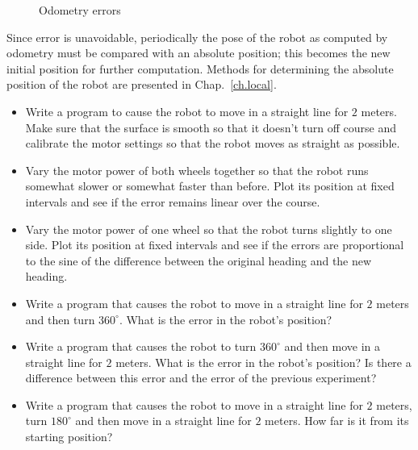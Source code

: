 \begin{figure}
\begin{center}
\end{center}
\caption{Odometry errors}\label{fig.odo-errors}
\end{figure}

Since error is unavoidable, periodically the pose of the robot as computed by odometry must be compared with an absolute position; this becomes the new initial position for further computation. Methods for determining the absolute position of the robot are presented in Chap.~\ref{ch.local}.

\begin{framed}
\begin{itemize}
\item Write a program to cause the robot to move in a straight line for $2$ meters. Make sure that the surface is smooth so that it doesn't turn off course and calibrate the motor settings so that the robot moves as straight as possible.
\item Vary the motor power of both wheels together so that the robot runs somewhat slower or somewhat faster than before. Plot its position at fixed intervals and see if the error remains linear over the course.
\item Vary the motor power of one wheel so that the robot turns slightly to one side. Plot its position at fixed intervals and see if the errors are proportional to the sine of the difference between the original heading and the new heading.
\end{itemize}
\end{framed}

\begin{framed}
\begin{itemize}
\item Write a program that causes the robot to move in a straight line for $2$ meters and then turn $360^\circ$. What is the error in the robot's position?
\item Write a program that causes the robot to turn $360^\circ$ and then move in a straight line for $2$ meters. What is the error in the robot's position? Is there a difference between this error and the error of the previous experiment?
\item Write a program that causes the robot to move in a straight line for $2$ meters, turn $180^\circ$ and then move in a straight line for $2$ meters. How far is it from its starting position?
\end{itemize}
\end{framed}

